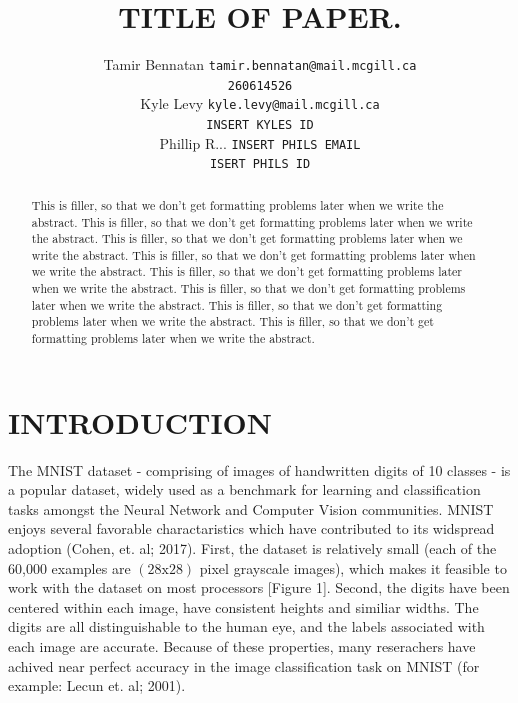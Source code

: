 \documentclass[letterpaper, 10 pt, conference]{ieeeconf}  %
\title{\LARGE \bf
TITLE OF PAPER.
}
\author{ \parbox{2 in}{\centering Tamir Bennatan
         {\tt\small tamir.bennatan@mail.mcgill.ca\\}
         {\tt\small 260614526}}
         \hspace*{ 0.3 in}
         \parbox{2 in}{\centering Kyle Levy
         {\tt\small kyle.levy@mail.mcgill.ca\\}
         {\tt\small INSERT KYLES ID}}
         \hspace*{0.3 in}
         \parbox{2 in}{\centering Phillip R...
         {\tt\small INSERT PHILS EMAIL\\}
         {\tt\small ISERT PHILS ID}}
}
\begin{document}
\maketitle
\thispagestyle{empty}
\pagestyle{empty}


\begin{abstract}

This is filler, so that we don't get formatting problems later when we write the abstract. This is filler, so that we don't get formatting problems later when we write the abstract. This is filler, so that we don't get formatting problems later when we write the abstract. This is filler, so that we don't get formatting problems later when we write the abstract. This is filler, so that we don't get formatting problems later when we write the abstract. This is filler, so that we don't get formatting problems later when we write the abstract. This is filler, so that we don't get formatting problems later when we write the abstract. This is filler, so that we don't get formatting problems later when we write the abstract. 

\end{abstract}


\section{INTRODUCTION}

The MNIST dataset - comprising of images of handwritten digits of 10 classes - is a popular dataset, widely used as a  benchmark for learning and classification tasks amongst the Neural Network and Computer Vision communities. MNIST enjoys several favorable charactaristics which have contributed to its widspread adoption (Cohen, et. al; 2017). First, the dataset is relatively small (each of the 60,000 examples are $(28\text{x}28)$ pixel grayscale images), which makes it feasible to work with the dataset on most processors [Figure 1]. Second, the digits have been centered within each image, have consistent heights and similiar widths. The digits are all distinguishable to the human eye, and the labels associated with each image are accurate. Because of these properties, many reserachers have achived near perfect accuracy in the image classification task on MNIST (for example: Lecun et. al; 2001).
\end{document}
